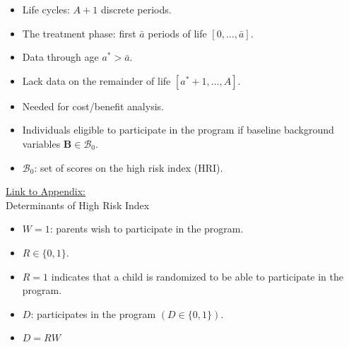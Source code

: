 \documentclass[static]{JJH-Beamer}
\begin{document}
\begin{itemize}
\item Life cycles: $A+1$ discrete periods.
\item The treatment phase: first $\bar{a}$ periods of life $\left[0,\dots,\bar{a}\right]$.
\item Data through age $a^{*} > \bar{a}$.
\item Lack data on the remainder of life $[a^* + 1,\dots,A]$.
\item Needed for cost/benefit analysis.
\end{itemize}

\begin{frame}

\begin{itemize}
\item Individuals eligible to participate in the program if baseline background variables $\bm{B}\in\mathcal{B}_0$.
\item $\mathcal{B}_0$: set of scores on the high risk index (HRI).
\end{itemize}

\end{frame}

\begin{frame}

\hypertarget{ret:chocohocochip}{}
\begin{center}
\hyperlink{chocohocochip}{\underline{Link to Appendix:}}\\
Determinants of High Risk Index
\end{center}

\end{frame}

\begin{frame}

\begin{itemize}
\item $W=1$: parents wish to participate in the program.
\item $R \in \{0,1\}$.
\item $R=1$ indicates that a child is randomized to be able to participate in the program.
\item $D$: participates in the program $(D \in \{ 0,1 \})$.
\item $D=RW$
\end{itemize}

\end{frame}
\end{document}
